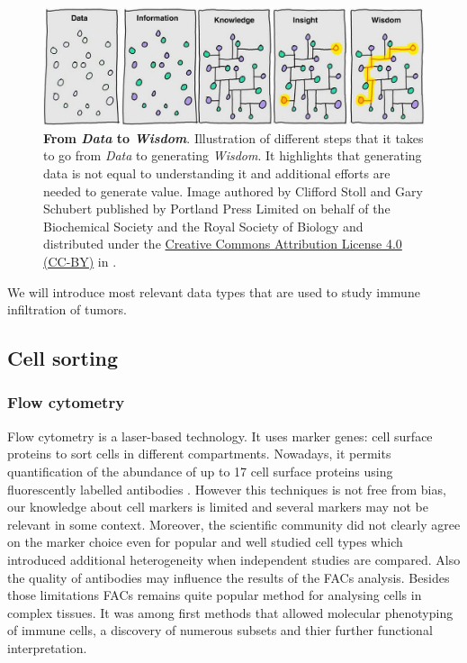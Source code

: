 \documentclass[12pt,]{book}
\theoremstyle{definition}
\theoremstyle{definition}
\theoremstyle{definition}
\theoremstyle{remark}
\begin{document}
\begin{figure}

{\centering \includegraphics[width=0.8\linewidth]{figures-ext/01-Information_power} 

}

\caption{\textbf{From \emph{Data} to
\emph{Wisdom}}. Illustration of different steps that it takes to go from
\emph{Data} to generating \emph{Wisdom}. It highlights that generating
data is not equal to understanding it and additional efforts are needed
to generate value. Image authored by Clifford Stoll and Gary Schubert
published by Portland Press Limited on behalf of the Biochemical Society
and the Royal Society of Biology and distributed under the
\href{https://creativecommons.org/licenses/by/4.0/}{Creative Commons
Attribution License 4.0 (CC-BY)} in \citep{Ponting2017}.}\label{fig:information-power}
\end{figure}











We will introduce most relevant data types that are used to study immune
infiltration of tumors.

\hypertarget{facs}{%
\subsection{Cell sorting}\label{facs}}

\hypertarget{flow-cytometry}{%
\subsubsection{Flow cytometry}\label{flow-cytometry}}

Flow cytometry is a laser-based technology. It uses marker genes: cell
surface proteins to sort cells in different compartments. Nowadays, it
permits quantification of the abundance of up to 17 cell surface
proteins using fluorescently labelled antibodies \citep{Papalexi2017}.
However this techniques is not free from bias, our knowledge about cell
markers is limited and several markers may not be relevant in some
context. Moreover, the scientific community did not clearly agree on the
marker choice even for popular and well studied cell types which
introduced additional heterogeneity when independent studies are
compared. Also the quality of antibodies may influence the results of
the FACs analysis. Besides those limitations FACs remains quite popular
method for analysing cells in complex tissues. It was among first
methods that allowed molecular phenotyping of immune cells, a discovery
of numerous subsets and thier further functional interpretation.
\end{document}

